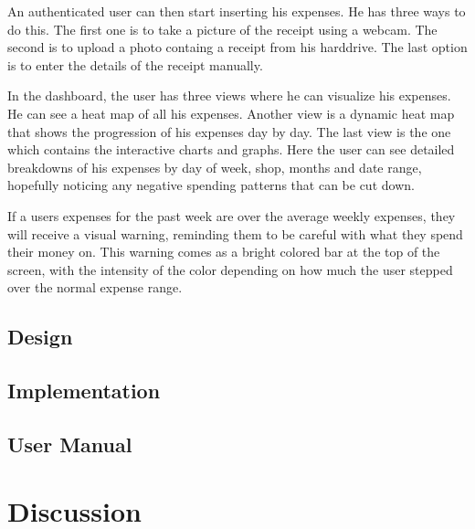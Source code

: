 An authenticated user can then start inserting his expenses. He has three ways to do this. The first one is to take a picture of the receipt using a webcam. The second is to upload a photo containg a receipt from his harddrive. The last option is to enter the details of the receipt manually. 

In the dashboard, the user has three views where he can visualize his expenses. He can see a heat map of all his expenses. Another view is a dynamic heat map that shows the progression of his expenses day by day. The last view is the one which contains the interactive charts and graphs. Here the user can see detailed breakdowns of his expenses by day of week, shop, months and date range, hopefully noticing any negative spending patterns that can be cut down. 

If a users expenses for the past week are over the average weekly expenses, they will receive a visual warning, reminding them to be careful with what they spend their money on. This warning comes as a bright colored bar at the top of the screen, with the intensity of the color depending on how much the user stepped over the normal expense range. 
\subsection{Design}
\subsection{Implementation}
\subsection{User Manual}
\label{sec:manual}
\section{Discussion}